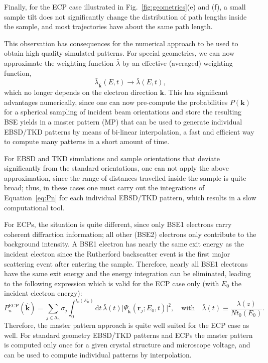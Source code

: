 Finally, for the ECP case illustrated in Fig.~\ref{fig:geometries}(e) and (f), a small sample tilt does not significantly change the distribution of path lengths inside the sample, and most trajectories have about the same path length.


This observation has consequences for the numerical approach to be used to obtain high quality simulated patterns. For special geometries, we can now approximate the weighting function $\bar{\lambda}$ by an effective (averaged) weighting function,
\begin{equation}
    \bar{\lambda}_{\hat{\mathbf{k}}}(E,t) \rightarrow \bar{\lambda}(E,t),
\end{equation}
which no longer depends on the electron direction $\mathbf{k}$.  This has significant advantages numerically, since one can now pre-compute the probabilities $P(\mathbf{k})$ for a spherical sampling of incident beam orientations and store the resulting BSE yields in a master pattern (MP) that can be used to generate individual EBSD/TKD patterns by means of bi-linear interpolation, a fast and efficient way to compute many patterns in a short amount of time.  

For EBSD and TKD simulations and sample orientations that deviate significantly from the standard orientations, one can not apply the above approximation, since the range of distances travelled inside the sample is quite broad; thus, in these cases one must carry out the integrations of Equation~\ref{eq:Pn} for each individual EBSD/TKD pattern, which results in a slow computational tool.

For ECPs, the situation is quite different, since only BSE1 electrons carry coherent diffraction information; all other (BSE2) electrons only contribute to the background intensity.  A BSE1 electron has nearly the same exit energy as the incident electron since the Rutherford backscatter event is the first major scattering event after entering the sample.  Therefore, nearly all BSE1 electrons have the same exit energy and the energy integration can be eliminated, leading to the following expression which is valid for the ECP case only (with $E_0$ the incident electron energy):
\begin{equation}
    P_n^{\text{ECP}}(\hat{\mathbf{k}}) = \sum_{j\in \mathcal{S}_n}\sigma_j
    \int_0^{t_0(E_0)}\!\!\!\!\!\!\mathrm{d}t\, \bar{\lambda}(t)\vert\Psi_{\hat{\mathbf{k}}}(\mathbf{r}_j;E_0,t)\vert^2,\quad\text{with}\quad  \bar{\lambda}(t) \equiv \frac{\lambda(z)}{N t_0(E_0)}.\label{eq:PnECP}
\end{equation}
Therefore, the master pattern approach is quite well suited for the ECP case as well. For standard geometry EBSD/TKD patterns and ECPs the master pattern is computed only once for a given crystal structure and microscope voltage, and can be used to compute individual patterns by interpolation.  

